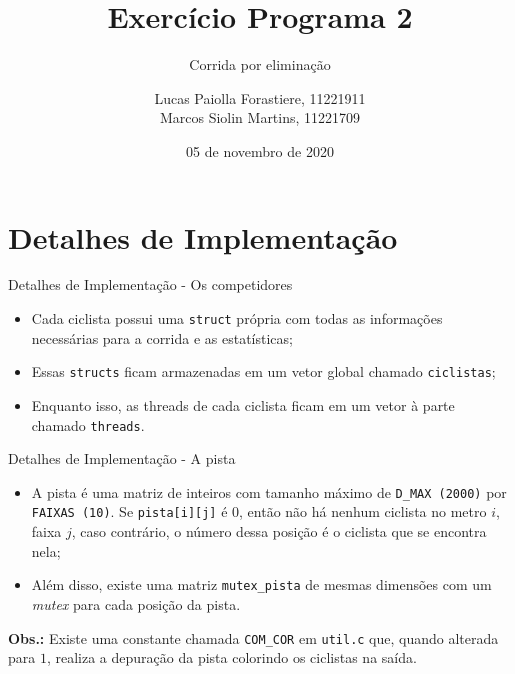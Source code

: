 \documentclass[10pt]{beamer}
\title{Exercício Programa 2}
\subtitle{Corrida por eliminação}
\institute{IME-USP}
\author{Lucas Paiolla Forastiere, 11221911\\ Marcos Siolin Martins, 11221709}
\date{05 de novembro de 2020}
\begin{document}
    \maketitle

    \section{Detalhes de Implementação}

    \begin{frame}{Detalhes de Implementação - Os competidores}
        \begin{itemize}
            \justifying
            \item Cada ciclista possui uma \texttt{struct} própria com todas
                as informações necessárias para a corrida e as estatísticas;
            \item Essas \texttt{structs} ficam armazenadas em um vetor global
                chamado \texttt{ciclistas};
            \item Enquanto isso, as threads de cada ciclista ficam em um vetor
                à parte chamado \texttt{threads}.

        \end{itemize}
    \end{frame}

    \begin{frame}{Detalhes de Implementação - A pista}
        \begin{itemize}
            \justifying
            \item A pista é uma matriz de inteiros com tamanho máximo de
                \texttt{D\_MAX (2000)} por \texttt{FAIXAS (10)}. Se
                \texttt{pista[i][j]} é $0$, então não há nenhum ciclista no
                metro $i$, faixa $j$, caso contrário, o número dessa posição é
                o ciclista que se encontra nela;
            \item Além disso, existe uma matriz \texttt{mutex\_pista} de mesmas
              dimensões com um \textit{mutex} para cada posição da pista.
        \end{itemize}
        \textbf{Obs.:} Existe uma constante chamada \texttt{COM\_COR} em
        \texttt{util.c} que, quando alterada para $1$, realiza a depuração da
        pista colorindo os ciclistas na saída.
    \end{frame}
\end{document}
